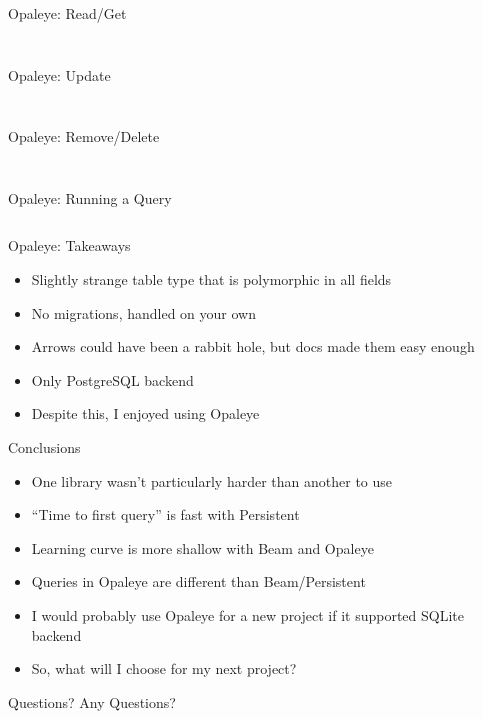 \documentclass[hyperref={pdfpagelabels=false},12pt]{beamer}
\newcommand{\pygment}[3]{
  \inputminted[frame=single,framesep=2mm,linenos,fontsize=#1]{#2}{#3}
}
\newcommand{\pygmentLines}[5]{
  \inputminted[frame=single,framesep=2mm,linenos,fontsize=#1,firstline=#2,lastline=#3,autogobble]{#4}{#5}
}
\begin{document}
\begin{frame}{Opaleye: Read/Get}
  \pygmentLines{\scriptsize}{127}{133}{haskell}{code/opaleye-example/src/Person.hs}
  \pygment{\scriptsize}{sql}{code/sql/selectWhere.sql}
\end{frame}

\begin{frame}{Opaleye: Update}
  \pygmentLines{\scriptsize}{113}{125}{haskell}{code/opaleye-example/src/Person.hs}
  \pygment{\scriptsize}{sql}{code/sql/updateSetWhereEmailAge.sql}
\end{frame}

\begin{frame}{Opaleye: Remove/Delete}
  \pygmentLines{\scriptsize}{89}{96}{haskell}{code/opaleye-example/src/Person.hs}
  \pygment{\scriptsize}{sql}{code/sql/deleteWhere.sql}
\end{frame}

\begin{frame}{Opaleye: Running a Query}
  \pygmentLines{\scriptsize}{26}{37}{haskell}{code/opaleye-example/test/Spec.hs}
\end{frame}

\begin{frame}{Opaleye: Takeaways}
  \begin{itemize}
    \item Slightly strange table type that is polymorphic in all fields
    \item No migrations, handled on your own
    \item Arrows could have been a rabbit hole, but docs made them easy enough
    \item Only PostgreSQL backend
    \item Despite this, I enjoyed using Opaleye
  \end{itemize}
\end{frame}

\begin{frame}{Conclusions}
  \begin{itemize}
    \item One library wasn't particularly harder than another to use
    \item ``Time to first query'' is fast with Persistent
    \item Learning curve is more shallow with Beam and Opaleye
    \item Queries in Opaleye are different than Beam/Persistent
    \item I would probably use Opaleye for a new project if it supported SQLite
      backend
    \item So, what will I choose for my next project?
  \end{itemize}
\end{frame}

\begin{frame}{Questions?}
  \centering \Huge Any Questions?
\end{frame}
\end{document}
